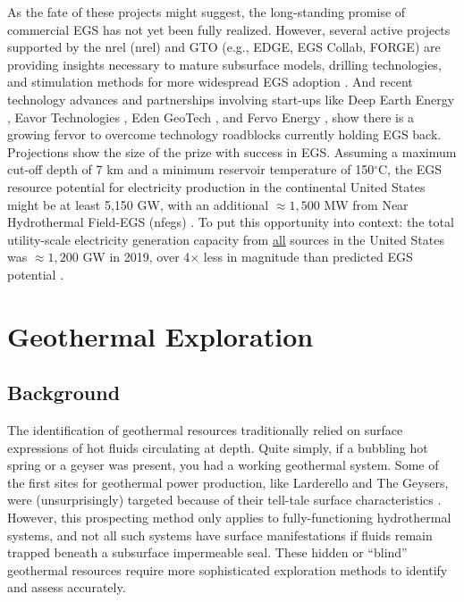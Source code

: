 As the fate of these projects might suggest, the long-standing promise of commercial EGS has not yet been fully realized. However, several active projects supported by the \acrlong{nrel} (\acrshort{nrel}) and GTO (e.g., EDGE, EGS Collab, FORGE) are providing insights necessary to mature subsurface models, drilling technologies, and stimulation methods for more widespread EGS adoption \citep{hamm_geothermal_2021}. And recent technology advances and partnerships involving start-ups like Deep Earth Energy \citep{geoenergy_saskatchewan_2021}, Eavor Technologies \citep{ross_energy_2020}, Eden GeoTech \citep{daso_eden_2020}, and Fervo Energy \citep{moss_google_2021,shieber_geothermal_2021}, show there is a growing fervor to overcome technology roadblocks currently holding EGS back. Projections show the size of the prize with success in EGS. Assuming a maximum cut-off depth of 7 km and a minimum reservoir temperature of 150$^\circ$C, the EGS resource potential for electricity production in the continental United States might be at least 5,150 GW, with an additional $\approx1,500$ MW from Near Hydrothermal Field-EGS (\acrshort{nfegs}) \citep{augustine_geovision_2019}. To put this opportunity into context: the total utility-scale electricity generation capacity from \underline{all} sources in the United States was $\approx1,200$ GW in 2019, over 4$\times$ less in magnitude than predicted EGS potential \citep{eia_electric_2020}.

\section{Geothermal Exploration}\label{ch2:geoexp}

\subsection{Background}\label{ch2:expl_background}

The identification of geothermal resources traditionally relied on surface expressions of hot fluids circulating at depth. Quite simply, if a bubbling hot spring or a geyser was present, you had a working geothermal system. Some of the first sites for geothermal power production, like Larderello and The Geysers, were (unsurprisingly) targeted because of their tell-tale surface characteristics \citep[p.\ 111]{glassley_geothermal_2015}. However, this prospecting method only applies to fully-functioning hydrothermal systems, and not all such systems have surface manifestations if fluids remain trapped beneath a subsurface impermeable seal. These hidden or “blind” geothermal resources require more sophisticated exploration methods to identify and assess accurately.


